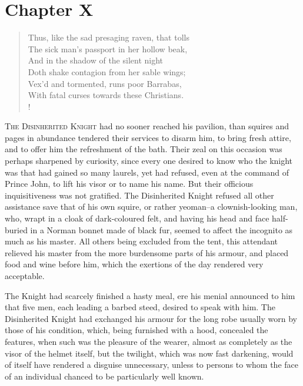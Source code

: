 \chapter{Chapter X}

\begin{verse}
Thus, like the sad presaging raven, that tolls\\
The sick man's passport in her hollow beak,\\
And in the shadow of the silent night\\
Doth shake contagion from her sable wings;\\
Vex'd and tormented, runs poor Barrabas,\\
With fatal curses towards these Christians.\\!
\end{verse}

\lettrine{T}{he Disinherited Knight} had no sooner reached his pavilion,
than squires
and pages in abundance tendered their services to disarm him, to bring
fresh attire, and to offer him the refreshment of the bath. Their zeal
on this occasion was perhaps sharpened by curiosity, since every one
desired to know who the knight was that had gained so many laurels, yet
had refused, even at the command of Prince John, to lift his visor or to
name his name. But their officious inquisitiveness was not gratified.
The Disinherited Knight refused all other assistance save that of his
own squire, or rather yeoman--a clownish-looking man, who, wrapt in a
cloak of dark-coloured felt, and having his head and face half-buried in
a Norman bonnet made of black fur, seemed to affect the incognito as
much as his master. All others being excluded from the tent, this
attendant relieved his master from the more burdensome parts of his
armour, and placed food and wine before him, which the exertions of the
day rendered very acceptable.

The Knight had scarcely finished a hasty meal, ere his menial announced
to him that five men, each leading a barbed steed, desired to speak with
him. The Disinherited Knight had exchanged his armour for the long robe
usually worn by those of his condition, which, being furnished with a
hood, concealed the features, when such was the pleasure of the wearer,
almost as completely as the visor of the helmet itself, but the
twilight, which was now fast darkening, would of itself have rendered a
disguise unnecessary, unless to persons to whom the face of an
individual chanced to be particularly well known.

